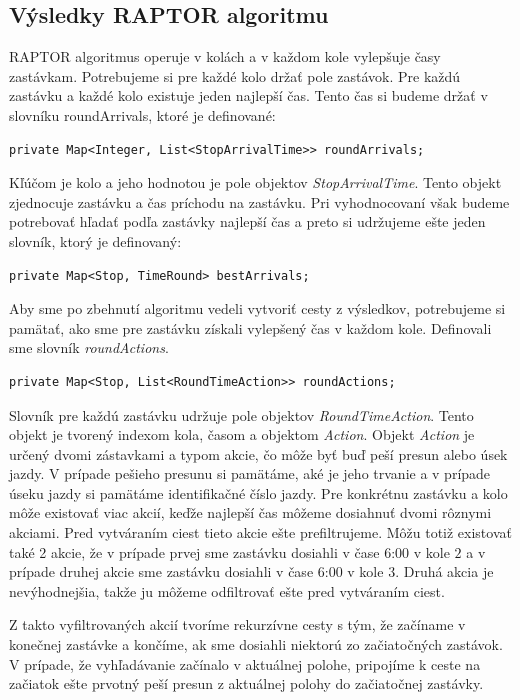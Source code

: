 \subsection{Výsledky RAPTOR algoritmu}
RAPTOR algoritmus operuje v kolách a v každom kole vylepšuje časy zastávkam. Potrebujeme si pre každé kolo držať pole zastávok. Pre každú zastávku a každé kolo existuje jeden najlepší čas. Tento čas si budeme držať v slovníku roundArrivals, ktoré je definované:
\begin{lstlisting}
private Map<Integer, List<StopArrivalTime>> roundArrivals; 
\end{lstlisting}
Kľúčom je kolo a jeho hodnotou je pole objektov \textit{StopArrivalTime}. Tento objekt zjednocuje zastávku a čas príchodu na zastávku. Pri vyhodnocovaní však budeme potrebovať hľadať podľa zastávky najlepší čas a preto si udržujeme ešte jeden slovník, ktorý je definovaný:
\begin{lstlisting}
private Map<Stop, TimeRound> bestArrivals;
\end{lstlisting}
Aby sme po zbehnutí algoritmu vedeli vytvoriť cesty z výsledkov, potrebujeme si pamätať, ako sme pre zastávku získali  vylepšený čas v každom kole. Definovali sme slovník \textit{roundActions}.
\begin{lstlisting}
private Map<Stop, List<RoundTimeAction>> roundActions;
\end{lstlisting}
Slovník pre každú zastávku udržuje pole objektov \textit{RoundTimeAction}. Tento objekt je tvorený indexom kola, časom a objektom \textit{Action}. Objekt \textit{Action} je určený dvomi zástavkami a typom akcie, čo môže byť buď peší presun alebo úsek jazdy. V prípade pešieho presunu si pamätáme, aké je jeho trvanie a v prípade úseku jazdy si pamätáme identifikačné číslo jazdy. Pre konkrétnu zastávku a kolo môže existovať viac akcií, keďže najlepší čas môžeme dosiahnuť dvomi rôznymi akciami. Pred vytváraním ciest tieto akcie ešte prefiltrujeme. Môžu totiž existovať také 2 akcie, že v prípade prvej sme zastávku dosiahli v čase 6:00 v kole $2$ a v prípade druhej akcie sme zastávku dosiahli v čase 6:00 v kole $3$. Druhá akcia je nevýhodnejšia, takže ju môžeme odfiltrovať ešte pred vytváraním ciest.

Z takto vyfiltrovaných akcií tvoríme rekurzívne cesty s tým, že začíname v konečnej zastávke a končíme, ak sme dosiahli niektorú zo začiatočných zastávok. V prípade, že vyhľadávanie začínalo v aktuálnej polohe, pripojíme k ceste na začiatok ešte prvotný peší presun z aktuálnej polohy do začiatočnej zastávky.


